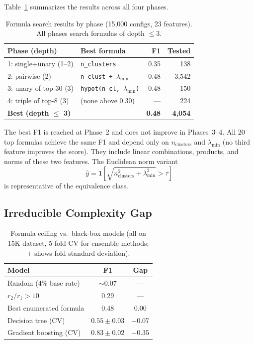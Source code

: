 \documentclass[journal]{IEEEtran}
\begin{document}
Table~\ref{tab:phases} summarizes the results across all four phases.

\begin{table}[h]
\caption{Formula search results by phase (15{,}000 configs, 23 features).
All phases search formulas of depth $\leq 3$.}
\label{tab:phases}
\scriptsize
\begin{tabular}{@{}llrr@{}}
\toprule
Phase (depth) & Best formula & F1 & Tested \\
\midrule
1: single+unary (1--2) & \texttt{n\_clusters} & 0.35 & 138 \\
2: pairwise (2) & \texttt{n\_clust + $\lambda_\mathrm{min}$} & 0.48 & 3{,}542 \\
3: unary of top-30 (3) & \texttt{hypot(n\_cl, $\lambda_\mathrm{min}$)} & 0.48 & 150 \\
4: triple of top-8 (3) & (none above 0.30) & --- & 224 \\
\midrule
\textbf{Best (depth $\leq$ 3)} & & \textbf{0.48} & \textbf{4{,}054} \\
\bottomrule
\end{tabular}
\end{table}

The best F1 is reached at Phase~2 and does not improve in Phases~3--4.
All 20 top formulas achieve the same F1 and depend only on
$n_\mathrm{clusters}$ and $\lambda_\mathrm{min}$ (no third feature
improves the score). They include linear combinations, products, and
norms of these two features. The Euclidean norm variant
\begin{equation}
\hat{y} = \mathbf{1}\!\left[
\sqrt{n_\mathrm{clusters}^2 + \lambda_\mathrm{min}^2} > \tau
\right]
\end{equation}
is representative of the equivalence class.

\subsection{Irreducible Complexity Gap}

\begin{table}[h]
\caption{Formula ceiling vs.\ black-box models (all on 15K dataset,
5-fold CV for ensemble methods; $\pm$ shows fold standard deviation).}
\label{tab:gap}
\begin{tabular}{lcc}
\toprule
Model & F1 & Gap \\
\midrule
Random (4\% base rate) & $\sim$0.07 & --- \\
$r_2/r_1 > 10$ & 0.29 & --- \\
Best enumerated formula & 0.48 & 0.00 \\
Decision tree (CV) & $0.55 \pm 0.03$ & $-$0.07 \\
Gradient boosting (CV) & $0.83 \pm 0.02$ & $-$0.35 \\
\bottomrule
\end{tabular}
\end{table}
\end{document}
